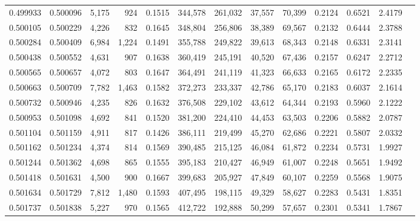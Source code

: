 \begin{tabular}{rrrrrrrrrrrrr}
0.499933 & 0.500096 &  5,175 &   924 &                                     0.1515 & 344,578 & 261,032 &  37,557 &  70,399 & 0.2124 & 0.6521 & 2.4179 \\
0.500105 & 0.500229 &  4,226 &   832 &                                     0.1645 & 348,804 & 256,806 &  38,389 &  69,567 & 0.2132 & 0.6444 & 2.3788 \\
0.500284 & 0.500409 &  6,984 & 1,224 &                                     0.1491 & 355,788 & 249,822 &  39,613 &  68,343 & 0.2148 & 0.6331 & 2.3141 \\
0.500438 & 0.500552 &  4,631 &   907 &                                     0.1638 & 360,419 & 245,191 &  40,520 &  67,436 & 0.2157 & 0.6247 & 2.2712 \\
0.500565 & 0.500657 &  4,072 &   803 &                                     0.1647 & 364,491 & 241,119 &  41,323 &  66,633 & 0.2165 & 0.6172 & 2.2335 \\
0.500663 & 0.500709 &  7,782 & 1,463 &                                     0.1582 & 372,273 & 233,337 &  42,786 &  65,170 & 0.2183 & 0.6037 & 2.1614 \\
0.500732 & 0.500946 &  4,235 &   826 &                                     0.1632 & 376,508 & 229,102 &  43,612 &  64,344 & 0.2193 & 0.5960 & 2.1222 \\
0.500953 & 0.501098 &  4,692 &   841 &                                     0.1520 & 381,200 & 224,410 &  44,453 &  63,503 & 0.2206 & 0.5882 & 2.0787 \\
0.501104 & 0.501159 &  4,911 &   817 &                                     0.1426 & 386,111 & 219,499 &  45,270 &  62,686 & 0.2221 & 0.5807 & 2.0332 \\
0.501162 & 0.501234 &  4,374 &   814 &                                     0.1569 & 390,485 & 215,125 &  46,084 &  61,872 & 0.2234 & 0.5731 & 1.9927 \\
0.501244 & 0.501362 &  4,698 &   865 &                                     0.1555 & 395,183 & 210,427 &  46,949 &  61,007 & 0.2248 & 0.5651 & 1.9492 \\
0.501418 & 0.501631 &  4,500 &   900 &                                     0.1667 & 399,683 & 205,927 &  47,849 &  60,107 & 0.2259 & 0.5568 & 1.9075 \\
0.501634 & 0.501729 &  7,812 & 1,480 &                                     0.1593 & 407,495 & 198,115 &  49,329 &  58,627 & 0.2283 & 0.5431 & 1.8351 \\
0.501737 & 0.501838 &  5,227 &   970 &                                     0.1565 & 412,722 & 192,888 &  50,299 &  57,657 & 0.2301 & 0.5341 & 1.7867 \\

\end{tabular}
